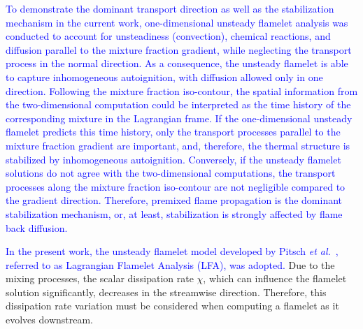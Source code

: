 \documentclass[review,3p,times]{elsarticle}
\begin{document}
\textcolor{blue}{To demonstrate the dominant transport direction as well as the stabilization mechanism in the current work, one-dimensional unsteady flamelet analysis was conducted to account for unsteadiness (convection), chemical reactions, and diffusion parallel to the mixture fraction gradient, while neglecting the transport process in the normal direction.  As a consequence, the unsteady flamelet is able to capture inhomogeneous autoignition, with diffusion allowed only in one direction.  Following the mixture fraction iso-contour, the spatial information from the two-dimensional computation could be interpreted as the time history of the corresponding mixture in the Lagrangian frame.  If the one-dimensional unsteady flamelet predicts this time history, only the transport processes parallel to the mixture fraction gradient are important, and, therefore, the thermal structure is stabilized by inhomogeneous autoignition.  Conversely, if the unsteady flamelet solutions do not agree with the two-dimensional computations, the transport processes along the mixture fraction iso-contour are not negligible compared to the gradient direction.  Therefore, premixed flame propagation is the dominant stabilization mechanism, or, at least, stabilization is strongly affected by flame back diffusion.}

\textcolor{blue}{In the present work, the unsteady flamelet model developed by Pitsch \emph{et al.}~\cite{pitsch98a}, referred to as Lagrangian Flamelet Analysis (LFA), was adopted.}  Due to the mixing processes, the scalar dissipation rate $\chi$, which can influence the flamelet solution significantly, decreases in the streamwise direction.  Therefore, this dissipation rate variation must be considered when computing a flamelet as it evolves downstream.
\end{document}
